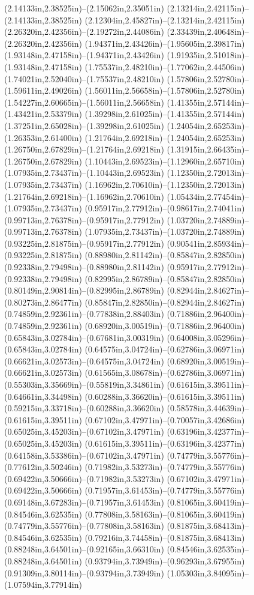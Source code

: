 (2.14133in,2.38525in)--(2.15062in,2.35051in) (2.13214in,2.42115in)--(2.14133in,2.38525in) (2.12304in,2.45827in)--(2.13214in,2.42115in) (2.26320in,2.42356in)--(2.19272in,2.44086in) (2.33439in,2.40648in)--(2.26320in,2.42356in) (1.94371in,2.43426in)--(1.95605in,2.39817in) (1.93148in,2.47158in)--(1.94371in,2.43426in) (1.91935in,2.51018in)--(1.93148in,2.47158in) (1.75537in,2.48210in)--(1.77062in,2.44506in) (1.74021in,2.52040in)--(1.75537in,2.48210in) (1.57806in,2.52780in)--(1.59611in,2.49026in) (1.56011in,2.56658in)--(1.57806in,2.52780in) (1.54227in,2.60665in)--(1.56011in,2.56658in) (1.41355in,2.57144in)--(1.43421in,2.53379in) (1.39298in,2.61025in)--(1.41355in,2.57144in) (1.37251in,2.65028in)--(1.39298in,2.61025in) (1.24054in,2.65253in)--(1.26353in,2.61400in) (1.21764in,2.69218in)--(1.24054in,2.65253in) (1.26750in,2.67829in)--(1.21764in,2.69218in) (1.31915in,2.66435in)--(1.26750in,2.67829in) (1.10443in,2.69523in)--(1.12960in,2.65710in) (1.07935in,2.73437in)--(1.10443in,2.69523in) (1.12350in,2.72013in)--(1.07935in,2.73437in) (1.16962in,2.70610in)--(1.12350in,2.72013in) (1.21764in,2.69218in)--(1.16962in,2.70610in) (1.05434in,2.77454in)--(1.07935in,2.73437in) (0.95917in,2.77912in)--(0.98617in,2.74041in) (0.99713in,2.76378in)--(0.95917in,2.77912in) (1.03720in,2.74889in)--(0.99713in,2.76378in) (1.07935in,2.73437in)--(1.03720in,2.74889in) (0.93225in,2.81875in)--(0.95917in,2.77912in) (0.90541in,2.85934in)--(0.93225in,2.81875in) (0.88980in,2.81142in)--(0.85847in,2.82850in) (0.92338in,2.79498in)--(0.88980in,2.81142in) (0.95917in,2.77912in)--(0.92338in,2.79498in) (0.82995in,2.86789in)--(0.85847in,2.82850in) (0.80149in,2.90814in)--(0.82995in,2.86789in) (0.82944in,2.84627in)--(0.80273in,2.86477in) (0.85847in,2.82850in)--(0.82944in,2.84627in) (0.74859in,2.92361in)--(0.77838in,2.88403in) (0.71886in,2.96400in)--(0.74859in,2.92361in) (0.68920in,3.00519in)--(0.71886in,2.96400in) (0.65843in,3.02784in)--(0.67681in,3.00319in) (0.64008in,3.05296in)--(0.65843in,3.02784in) (0.64575in,3.04724in)--(0.62786in,3.06971in) (0.66621in,3.02573in)--(0.64575in,3.04724in) (0.68920in,3.00519in)--(0.66621in,3.02573in) (0.61565in,3.08678in)--(0.62786in,3.06971in) (0.55303in,3.35669in)--(0.55819in,3.34861in) (0.61615in,3.39511in)--(0.64661in,3.34498in) (0.60288in,3.36620in)--(0.61615in,3.39511in) (0.59215in,3.33718in)--(0.60288in,3.36620in) (0.58578in,3.44639in)--(0.61615in,3.39511in) (0.67102in,3.47971in)--(0.70057in,3.42686in) (0.65025in,3.45203in)--(0.67102in,3.47971in) (0.63196in,3.42377in)--(0.65025in,3.45203in) (0.61615in,3.39511in)--(0.63196in,3.42377in) (0.64158in,3.53386in)--(0.67102in,3.47971in) (0.74779in,3.55776in)--(0.77612in,3.50246in) (0.71982in,3.53273in)--(0.74779in,3.55776in) (0.69422in,3.50666in)--(0.71982in,3.53273in) (0.67102in,3.47971in)--(0.69422in,3.50666in) (0.71957in,3.61453in)--(0.74779in,3.55776in) (0.69148in,3.67283in)--(0.71957in,3.61453in) (0.81065in,3.60419in)--(0.84546in,3.62535in) (0.77808in,3.58163in)--(0.81065in,3.60419in) (0.74779in,3.55776in)--(0.77808in,3.58163in) (0.81875in,3.68413in)--(0.84546in,3.62535in) (0.79216in,3.74458in)--(0.81875in,3.68413in) (0.88248in,3.64501in)--(0.92165in,3.66310in) (0.84546in,3.62535in)--(0.88248in,3.64501in) (0.93794in,3.73949in)--(0.96293in,3.67955in) (0.91309in,3.80114in)--(0.93794in,3.73949in) (1.05303in,3.84095in)--(1.07594in,3.77914in) 